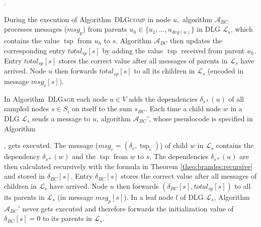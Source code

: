\documentclass[11pt]{article}
\newcommand{\todoI}[1]{}\newcommand{\blueI}[1]{}
\newcommand{\tsp}{\mathop{tsp}}
\newcommand{\calL}{\mathcal{L}}
\newif\iffull
\newif\ifshort
\begin{document}
.
\iffull
\begin{algorithm}[htb]
\begin{algorithmic}[1]
\STATE \COMMENT{INITIALIZATION} \label{line:fbcinitstart}
\STATE \textbf{global} $total_{sp}:=\{0,0,\dots,0\}$; \COMMENT{$total_{sp}[v]$ := total shortest paths from $v$ to $u$}
\IF{$gets_{sampled}=1$}
        \STATE $total_{sp}[u]:=1$;\label{line:fbcinitend}\newline
\ENDIF

\STATE \COMMENT{COMPUTATION, $f(v, msg_p)$: $v$ root node ID of the message, $msg_p$ message of a parent in $\calL_v$}
\STATE $total_{sp}[v]:=total_{sp}[v]+msg_p$;
\STATE $msg_c[v]:=total_{sp}[v]$; \COMMENT{output}
\end{algorithmic}
\caption{$\mathcal{A}_{BC}()$}
\label{alg:BC_f}
\vspace*{0.5cm}
\end{algorithm}
\fi 
During the execution of Algorithm\iffull~\ref{alg:DLGcomp}\fi~\textsc{DLGcomp} in node $u,$ algorithm $\mathcal{A}_{BC}$ processes messages ($msg_p$) from parents $u_h\in\{u_1,\dots,u_{deg(u)}\}$ in DLG $\calL_s$, which contains the value $\tsp$ from  $u_h$ to $s$.
Algorithm $\mathcal{A}_{BC}$ then updates the corresponding entry $total_{sp}[s]$ by adding the value $\tsp$ received from parent $u_h$. Entry $total_{sp}[s]$ stores the correct value after all messages of parents in $\calL_s$ have arrived. Node $u$ then forwards $total_{sp}[s]$ \iffull during the execution of Algorithm~\ref{alg:DLGcomp}~\textsc{DLGcomp} in Line \ref{line:sendreceivedist}\fi to all its children in $\calL_s$ (encoded in message $msg_c[s]$).

In Algorithm\iffull~\ref{alg:DLGagr}\fi~\textsc{DLGagr} each node $u\in V$ adds the dependencies $\delta_{s*}(u)$ of all sampled nodes $s\in S_i$ on itself to the sum $s_{BC}$. Each time a child node $w$ in a DLG $\calL_s$ sends a message to $u$, algorithm $\mathcal{A}_{BC}'$, whose pseudocode is specified in Algorithm
\ifshort
 \ref{FULL:alg:BC_g} in Appendix \ref{FULL:sec:algBC}
\fi
\iffull
 \ref{alg:BC_g}
\fi
, gets executed. The message ($msg_c=(\delta_c,\tsp_c)$) of child $w$ in $\calL_s$ contains the dependency $\delta_{s*}(w)$ and the $\tsp$ from $w$ to $s$. The dependencies $\delta_{s*}(u)$\todoI{these are approx, should they be called $\tilde{\delta}_{s*}(u)$?} are then calculated recursively with the formula in Theorem \ref{theo:brandes:recursive} and stored in $\delta_{BC}[s]$.
Entry $\delta_{BC}[s]$ stores the correct value after all messages of children in $\calL_s$ have arrived. Node $u$ then forwards $(\delta_{BC}[s], total_{sp}[s])$ \iffull during the execution of Algorithm~\ref{alg:DLGagr}~\textsc{DLGagr} in Line \ref{line:sendreceiveagg}\fi to all its parents in $\calL_s$ (in message $msg_p[s]$). In a leaf node $l$ of DLG $\calL_s$, Algorithm $\mathcal{A}_{BC}'$ never gets executed and therefore forwards the initialization value of $\delta_{BC}[s]=0$ to its parents in $\calL_s$.
\end{document}

